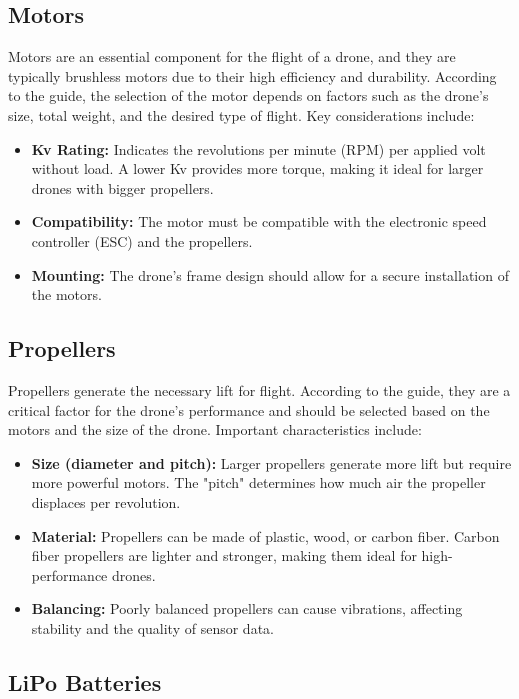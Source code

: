 \subsection{Motors}

Motors are an essential component for the flight of a drone, and they are typically brushless motors due to their high efficiency and durability. According to the guide, the selection of the motor depends on factors such as the drone's size, total weight, and the desired type of flight. Key considerations include:

\begin{itemize}
    \item \textbf{Kv Rating:} Indicates the revolutions per minute (RPM) per applied volt without load. A lower Kv provides more torque, making it ideal for larger drones with bigger propellers.
    \item \textbf{Compatibility:} The motor must be compatible with the electronic speed controller (ESC) and the propellers.
    \item \textbf{Mounting:} The drone's frame design should allow for a secure installation of the motors.
\end{itemize}

\subsection{Propellers}

Propellers generate the necessary lift for flight. According to the guide, they are a critical factor for the drone's performance and should be selected based on the motors and the size of the drone. Important characteristics include:

\begin{itemize}
    \item \textbf{Size (diameter and pitch):} Larger propellers generate more lift but require more powerful motors. The "pitch" determines how much air the propeller displaces per revolution.
    \item \textbf{Material:} Propellers can be made of plastic, wood, or carbon fiber. Carbon fiber propellers are lighter and stronger, making them ideal for high-performance drones.
    \item \textbf{Balancing:} Poorly balanced propellers can cause vibrations, affecting stability and the quality of sensor data.
\end{itemize}

\subsection{LiPo Batteries}

